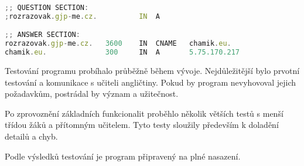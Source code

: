 \begin{lstlisting}[language=JavaScript,caption={Úryvek výpisu programu dig}]
;; QUESTION SECTION:
;rozrazovak.gjp-me.cz.		    IN	A

;; ANSWER SECTION:
rozrazovak.gjp-me.cz.	3600    IN	CNAME	chamik.eu.
chamik.eu.		        300	    IN	A	    5.75.170.217
\end{lstlisting}

Testování programu probíhalo průběžně během vývoje. Nejdůležitější bylo prvotní testování a komunikace s učiteli angličtiny. Pokud by program nevyhovoval jejich požadavkům, postrádal by význam a užitečnost.

Po zprovoznění základních funkcionalit proběhlo několik větších testů s menší třídou žáků a přítomným učitelem. Tyto testy sloužily především k doladění detailů a chyb.

Podle výsledků testování je program připravený na plné nasazení.

